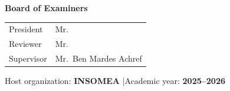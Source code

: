 \begin{titlepage}
\vfill

{\small
\textbf{Board of Examiners}\\[0.2cm]
\begin{tabular}{ll}
President & Mr.\ \dotfill\hspace{3.5cm}\\
Reviewer  & Mr.\ \dotfill\hspace{3.5cm}\\
Supervisor & Mr.\ Ben Mardes Achref\\
\end{tabular}}

\vspace{1cm}
{\small Host organization: \textbf{INSOMEA} \quad|\quad Academic year: \textbf{2025--2026}}

\end{titlepage}
